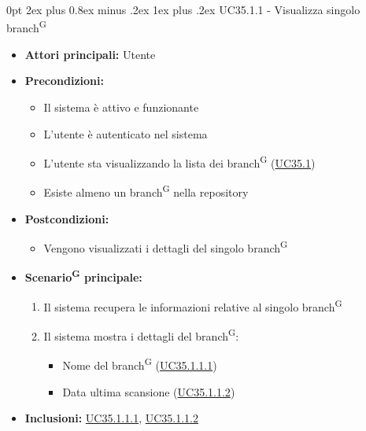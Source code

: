 \documentclass[a4paper, 11pt]{article}
\makeatletter
\renewcommand\subparagraph{\@startsection{subparagraph}{5}
  {0pt}
  {2ex plus 0.8ex minus .2ex}
  {1ex plus .2ex}
  {\normalfont\normalsize\bfseries\color{AccentColor}}}
\makeatother
\begin{document}
\subparagraph{UC35.1.1 - Visualizza singolo branch\textsuperscript{G}}\label{UC35.1.1}
\begin{itemize}
    \item \textbf{Attori principali:} Utente
    \item \textbf{Precondizioni:}
    \begin{itemize}
        \item Il sistema è attivo e funzionante
        \item L'utente è autenticato nel sistema
        \item L'utente sta visualizzando la lista dei branch\textsuperscript{G} (\hyperref[UC35.1]{UC35.1})
        \item Esiste almeno un branch\textsuperscript{G} nella repository
    \end{itemize}
    \item \textbf{Postcondizioni:}
    \begin{itemize}
        \item Vengono visualizzati i dettagli del singolo branch\textsuperscript{G}
    \end{itemize}
    \item \textbf{Scenario\textsuperscript{G} principale:}
    \begin{enumerate}
        \item Il sistema recupera le informazioni relative al singolo branch\textsuperscript{G}
        \item Il sistema mostra i dettagli del branch\textsuperscript{G}:
        \begin{itemize}
            \item Nome del branch\textsuperscript{G} (\hyperref[UC35.1.1.1]{UC35.1.1.1})
            \item Data ultima scansione (\hyperref[UC35.1.1.2]{UC35.1.1.2})
        \end{itemize}
    \end{enumerate}
    \item \textbf{Inclusioni:} \hyperref[UC35.1.1.1]{UC35.1.1.1}, \hyperref[UC35.1.1.2]{UC35.1.1.2}
\end{itemize}
\end{document}
